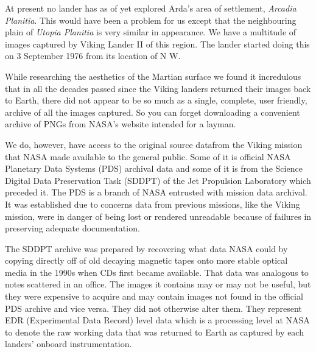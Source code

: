 At present no lander has as of yet explored Arda's area of settlement, {\it Arcadia Planitia}. This would have been a problem for us except that the neighbouring plain of {\it Utopia Planitia} is very similar in appearance. We have a multitude of images captured by Viking Lander II of this region. The lander started doing this on 3 September 1976 from its location of N W.

    {}

\page
{}

While researching the aesthetics of the Martian surface we found it incredulous that in all the decades passed since the Viking landers returned their images back to Earth, there did not appear to be so much as a single, complete, user friendly, archive of all the images captured. So you can forget downloading a convenient archive of PNGs from NASA's website intended for a layman.\footnotecite[grayzeck2008]

We do, however, have access to the original source data from the Viking mission that NASA made available to the general public. Some of it is official NASA Planetary Data Systems (PDS) archival data and some of it is from the Science Digital Data Preservation Task (SDDPT) of the Jet Propulsion Laboratory which preceded it. The PDS is a branch of NASA entrusted with mission data archival. It was established due to concerns data from previous missions, like the Viking mission, were in danger of being lost or rendered unreadable because of failures in preserving adequate documentation.
    {}

The SDDPT archive was prepared by recovering what data NASA could by copying directly off of old decaying magnetic tapes onto more stable optical media in the 1990s when CDs first became available. That data was  analogous to notes scattered in an office. The images it contains may or may not be useful, but they were expensive to acquire and may contain images not found in the official PDS archive and vice versa. They did not otherwise alter them. They represent EDR (Experimental Data Record) level data which is a processing level at NASA to denote the raw working data that was returned to Earth as captured by each landers' onboard instrumentation.

